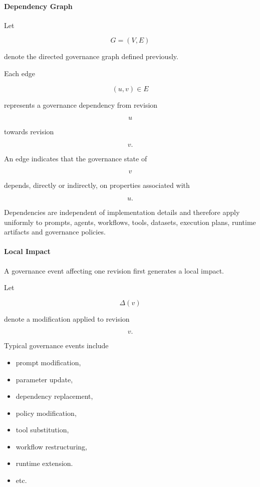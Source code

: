 \documentclass[10pt]{article}
\begin{document}
\paragraph{Dependency Graph}

Let

\[
G=(V,E)
\]

denote the directed governance graph defined previously.

Each edge

\[
(u,v)\in E
\]

represents a governance dependency from revision

\[
u
\]

towards revision

\[
v.
\]

An edge indicates that the governance state of

\[
v
\]

depends, directly or indirectly, on properties associated with

\[
u.
\]

Dependencies are independent of implementation details and therefore apply
uniformly to prompts, agents, workflows, tools, datasets, execution plans,
runtime artifacts and governance policies.

\paragraph{Local Impact}

A governance event affecting one revision first generates a local impact.

Let

\[
\Delta(v)
\]

denote a modification applied to revision

\[
v.
\]

Typical governance events include

\begin{itemize}
	\item prompt modification,
	\item parameter update,
	\item dependency replacement,
	\item policy modification,
	\item tool substitution,
	\item workflow restructuring,
	\item runtime extension.
	\item etc.
\end{itemize}
\end{document}
